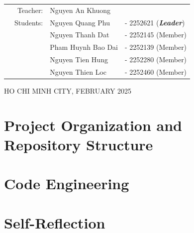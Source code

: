\documentclass[openany]{mitthesis}
\theoremstyle{definition}
\begin{document}
\begin{titlepage}
\begin{table}[h]
\begin{tabular}{rrll}
\hspace{5 cm} & Teacher: & Nguyen An Khuong & \\
& Students: & Nguyen Quang Phu &- 2252621 (\textbf{\textit{Leader}})  \\
& & Nguyen Thanh Dat &- 2252145 (Member) \\
& & Pham Huynh Bao Dai &- 2252139 (Member) \\
& & Nguyen Tien Hung &- 2252280 (Member) \\
& & Nguyen Thien Loc &- 2252460 (Member) \\
\end{tabular}
\end{table}

\begin{center}
{\footnotesize HO CHI MINH CITY, FEBRUARY 2025}
\end{center}
\restoregeometry
\end{titlepage}

\tableofcontents
\listoffigures
\listoftables

\pgfplotsset{compat=1.18}

%



\chapter{Project Organization and Repository Structure}
    

\chapter{Code Engineering}
    
    
    
    


\chapter{Self-Reflection}
    
    

% 
\end{document}
